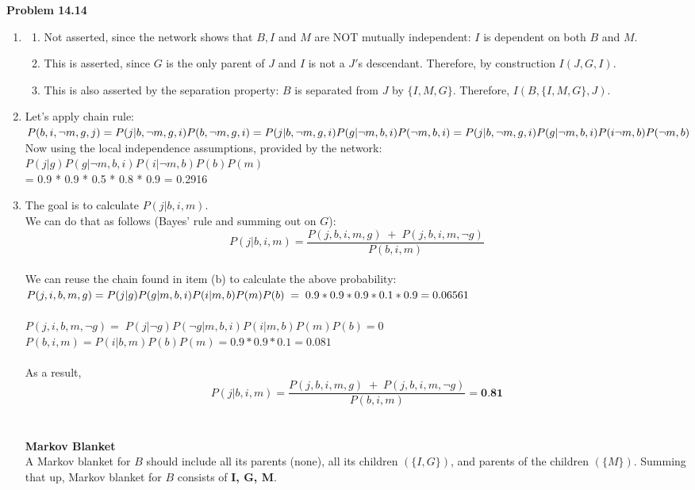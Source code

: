 \documentclass[11pt]{article}
\begin{document}
\textbf{Problem 14.14}
\begin{enumerate}[label=(\alph*)]
  \item
      \begin{enumerate}
        \item Not asserted, since the network shows that $B, I$ and $M$ are NOT mutually independent: $I$ is dependent on both $B$ and $M$.
        \item This is asserted, since $G$ is the only parent of $J$ and $I$ is not a $J'$s descendant. Therefore, by construction $I(J, G, I)$.
        \item This is also asserted by the separation property: $B$ is separated from $J$ by $\{ I, M, G\}$. Therefore, $I(B,\{ I, M, G\}, J)$.
      \end{enumerate}
  \item Let's apply chain rule:\\
  $P(b, i, \neg m, g, j) = P(j|b, \neg m, g, i)P(b, \neg m, g, i) \\ = P(j|b, \neg m, g, i)P(g|\neg m, b, i)P(\neg m, b, i)
  \\ = P(j|b, \neg m, g, i)P(g|\neg m, b, i)P(i\neg m, b)P(\neg m, b)$\\
  Now using the local independence assumptions, provided by the network:\\
    $P(j|g)P(g|\neg m, b, i)P(i|\neg m, b)P(b)P(m)$\\
  = 0.9 * 0.9 * 0.5 * 0.8 * 0.9 = 0.2916
  \item The goal is to calculate $P(j|b,i,m)$.\\
  We can do that as follows (Bayes’ rule and summing out on $G$):\\
  \[ P(j|b, i, m)=\frac{P(j, b, i, m, g) \; + \; P(j, b, i, m, \neg g)}{P(b, i, m)} \]\\
  We can reuse the chain found in item (b) to calculate the above probability:\\
  $P(j,i,b,m,g)= P(j|g)P(g|m,b,i)P(i|m,b)P(m)P(b)\\
  \; = \; 0.9*0.9*0.9*0.1*0.9=0.06561$\\ \\
  $P(j,i,b,m,\neg g) = \; P(j|\neg g)P(\neg g|m, b, i)P(i|m, b)P(m)P(b) = 0$\\
  $P(b, i, m)= P(i|b,m)P(b)P(m) = 0.9*0.9*0.1=0.081$\\ \\
  As a result,
    \[ P(j|b, i, m)=\frac{P(j, b, i, m, g) \; + \; P(j, b, i, m, \neg g)}{P(b, i, m)}=\textbf{0.81} \]\\ \\
\textbf{Markov Blanket}\\
A Markov blanket for $B$ should include all its parents (none), all its children $(\{ I, G\})$,
and parents of the children $(\{ M\})$. Summing that up, Markov blanket for $B$ consists of \textbf{I, G, M}.



\end{enumerate}
\end{document}
